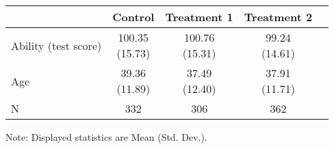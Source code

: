 \renewcommand\cellalign{t}
\begin{threeparttable}
\begin{tabular}{lcccc}
\toprule
 & Control & Treatment 1 & Treatment 2 \\
\midrule
\addlinespace
Ability (test score) & \makecell{100.35\\(15.73)} & \makecell{100.76\\(15.31)} & \makecell{99.24\\(14.61)} \\
Age & \makecell{39.36\\(11.89)} & \makecell{37.49\\(12.40)} & \makecell{37.91\\(11.71)} \\
\midrule
\addlinespace
N & 332 & 306 & 362 \\
\bottomrule
\end{tabular}
\footnotesize Note: Displayed statistics are Mean (Std. Dev.).
\end{threeparttable}